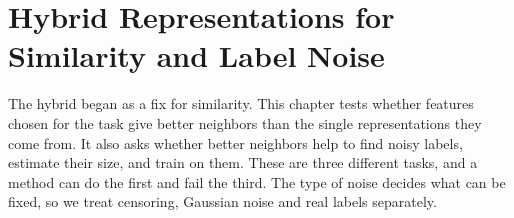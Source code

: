 \chapter{Hybrid Representations for Similarity and Label Noise}\label{chap:similarity}

The hybrid began as a fix for similarity. This chapter tests whether features chosen for the task give better neighbors than the single representations they come from. It also asks whether better neighbors help to find noisy labels, estimate their size, and train on them. These are three different tasks, and a method can do the first and fail the third. The type of noise decides what can be fixed, so we treat censoring, Gaussian noise and real labels separately.


